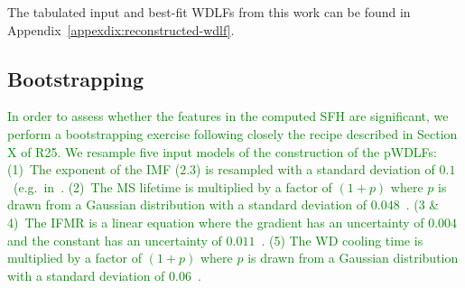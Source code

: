\documentclass[fleqn,usenatbib]{mnras}
\begin{document}
The tabulated input and best-fit WDLFs from this work can be found in
Appendix~\ref{appexdix:reconstructed-wdlf}.

\subsection{Bootstrapping}
\textcolor{green}{
In order to assess whether the features in the computed SFH are significant, we
perform a bootstrapping exercise following closely the recipe described in
Section X of R25. We resample five input models of the construction of the
pWDLFs: (1)~The exponent of the IMF ($2.3$) is resampled with a standard
deviation of $0.1$~(e.g.\ in~\citet{2018ApJ...860L..17E, 2025MNRAS.538.2548R}.
(2)~The MS lifetime is multiplied by a factor of $(1+p)$ where $p$ is drawn
from a Gaussian distribution with a standard deviation of
$0.048$~\citep{2000MNRAS.315..543H}. (3 \& 4)~The IFMR is a linear equation where
the gradient has an uncertainty of $0.004$ and the constant has an uncertainty
of $0.011$~\citep{2008MNRAS.387.1693C}. (5) The WD cooling time is multiplied
by a factor of $(1+p)$ where $p$ is drawn from a Gaussian distribution with a
standard deviation of $0.06$~\citep{2023MNRAS.522.1643C, 2024MNRAS.527.3602C}.
}
\end{document}

